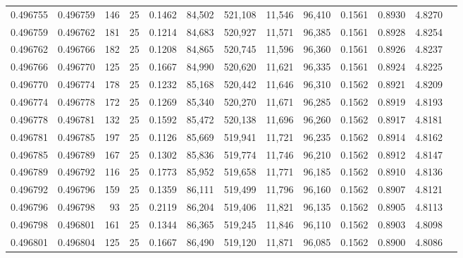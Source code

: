 \begin{tabular}{rrrrrrrrrrrrr}
0.496755 & 0.496759 & 146 &  25 &                                     0.1462 &  84,502 & 521,108 &  11,546 &  96,410 & 0.1561 & 0.8930 & 4.8270 \\
0.496759 & 0.496762 & 181 &  25 &                                     0.1214 &  84,683 & 520,927 &  11,571 &  96,385 & 0.1561 & 0.8928 & 4.8254 \\
0.496762 & 0.496766 & 182 &  25 &                                     0.1208 &  84,865 & 520,745 &  11,596 &  96,360 & 0.1561 & 0.8926 & 4.8237 \\
0.496766 & 0.496770 & 125 &  25 &                                     0.1667 &  84,990 & 520,620 &  11,621 &  96,335 & 0.1561 & 0.8924 & 4.8225 \\
0.496770 & 0.496774 & 178 &  25 &                                     0.1232 &  85,168 & 520,442 &  11,646 &  96,310 & 0.1562 & 0.8921 & 4.8209 \\
0.496774 & 0.496778 & 172 &  25 &                                     0.1269 &  85,340 & 520,270 &  11,671 &  96,285 & 0.1562 & 0.8919 & 4.8193 \\
0.496778 & 0.496781 & 132 &  25 &                                     0.1592 &  85,472 & 520,138 &  11,696 &  96,260 & 0.1562 & 0.8917 & 4.8181 \\
0.496781 & 0.496785 & 197 &  25 &                                     0.1126 &  85,669 & 519,941 &  11,721 &  96,235 & 0.1562 & 0.8914 & 4.8162 \\
0.496785 & 0.496789 & 167 &  25 &                                     0.1302 &  85,836 & 519,774 &  11,746 &  96,210 & 0.1562 & 0.8912 & 4.8147 \\
0.496789 & 0.496792 & 116 &  25 &                                     0.1773 &  85,952 & 519,658 &  11,771 &  96,185 & 0.1562 & 0.8910 & 4.8136 \\
0.496792 & 0.496796 & 159 &  25 &                                     0.1359 &  86,111 & 519,499 &  11,796 &  96,160 & 0.1562 & 0.8907 & 4.8121 \\
0.496796 & 0.496798 &  93 &  25 &                                     0.2119 &  86,204 & 519,406 &  11,821 &  96,135 & 0.1562 & 0.8905 & 4.8113 \\
0.496798 & 0.496801 & 161 &  25 &                                     0.1344 &  86,365 & 519,245 &  11,846 &  96,110 & 0.1562 & 0.8903 & 4.8098 \\
0.496801 & 0.496804 & 125 &  25 &                                     0.1667 &  86,490 & 519,120 &  11,871 &  96,085 & 0.1562 & 0.8900 & 4.8086 \\

\end{tabular}
